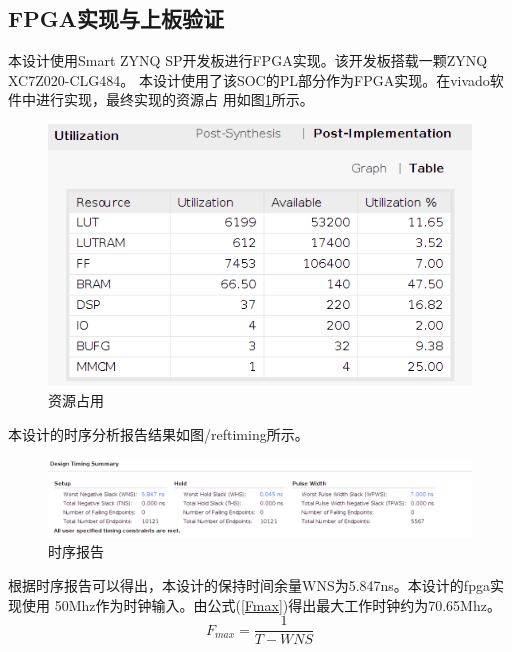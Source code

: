 \documentclass{article}
\numberwithin {equation}{section}
\begin{document}
\begin{spacing}{1.25}
\section{FPGA实现与上板验证}
  本设计使用Smart ZYNQ SP开发板进行FPGA实现。该开发板搭载一颗ZYNQ XC7Z020-CLG484。
  本设计使用了该SOC的PL部分作为FPGA实现。在vivado软件中进行实现，最终实现的资源占
  用如图\ref{implementation}所示。
  \begin{figure}[H]
    \centering
    \includegraphics[scale=0.5]{./pictures/资源占用.png}
    \caption{资源占用}
    \label{implementation}
  \end{figure}

  本设计的时序分析报告结果如图/ref{timing}所示。
  \begin{figure}[H]
    \centering
    \includegraphics[scale=0.4]{./pictures/时序报告.png}
    \caption{时序报告}
    \label{timing}
  \end{figure}
  根据时序报告可以得出，本设计的保持时间余量WNS为5.847ns。本设计的fpga实现使用
  50Mhz作为时钟输入。由公式(\ref{Fmax})得出最大工作时钟约为70.65Mhz。
  \begin{equation}
    F_{max}=\frac{1}{T-{WNS}}
    \label{Fmax}
  \end{equation}



\end{spacing}
\end{document}
